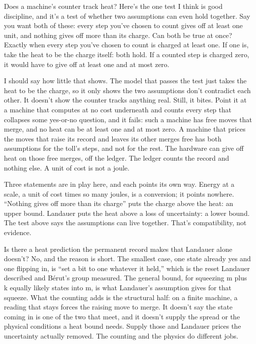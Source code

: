 \documentclass[11pt,twoside]{article}
\theoremstyle{thielethm}
\theoremstyle{thieledef}
\theoremstyle{thieledef}
\theoremstyle{thieledef}
\theoremstyle{thielethm}
\theoremstyle{thieleobs}
\theoremstyle{thielethm}
\begin{document}
Does a machine's counter track heat? Here's the one test I think is good discipline, and it's a test of whether two assumptions can even hold together. Say you want both of these: every step you've chosen to count gives off at least one unit, and nothing gives off more than its charge. Can both be true at once? Exactly when every step you've chosen to count is charged at least one. If one is, take the heat to be the charge itself: both hold. If a counted step is charged zero, it would have to give off at least one and at most zero.

I should say how little that shows. The model that passes the test just takes the heat to be the charge, so it only shows the two assumptions don't contradict each other. It doesn't show the counter tracks anything real. Still, it bites. Point it at a machine that computes at no cost underneath and counts every step that collapses some yes-or-no question, and it fails: such a machine has free moves that merge, and no heat can be at least one and at most zero. A machine that prices the moves that raise its record and leaves its other merges free has both assumptions for the toll's steps, and not for the rest. The hardware can give off heat on those free merges, off the ledger. The ledger counts the record and nothing else. A unit of cost is not a joule.

Three statements are in play here, and each points its own way. Energy at a scale, a unit of cost times so many joules, is a conversion; it points nowhere. ``Nothing gives off more than its charge'' puts the charge above the heat: an upper bound. Landauer puts the heat above a loss of uncertainty: a lower bound. The test above says the assumptions can live together. That's compatibility, not evidence.

Is there a heat prediction the permanent record makes that Landauer alone doesn't? No, and the reason is short. The smallest case, one state already yes and one flipping in, is ``set a bit to one whatever it held,'' which is the reset Landauer described and Bérut's group measured. The general bound, for squeezing m plus k equally likely states into m, is what Landauer's assumption gives for that squeeze. What the counting adds is the structural half: on a finite machine, a reading that stays forces the raising move to merge. It doesn't say the state coming in is one of the two that meet, and it doesn't supply the spread or the physical conditions a heat bound needs. Supply those and Landauer prices the uncertainty actually removed. The counting and the physics do different jobs.
\end{document}
